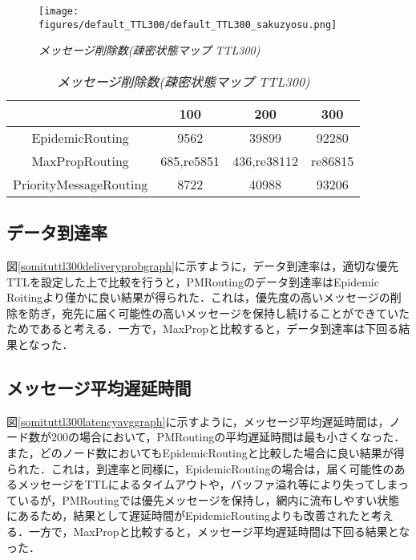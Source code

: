 \documentclass[11pt]{icsthesis}
\begin{document}
\begin{figure}[h]
\centering
\texttt{[image: figures/default\_TTL300/default\_TTL300\_sakuzyosu.png]}
\caption[]{\it{メッセージ削除数(疎密状態マップ TTL300)}}
\label{somituttl300droppedgraph}
\end{figure}

\begin{table}[H]
 \begin{center}
      \caption[]{\it{メッセージ削除数(疎密状態マップ TTL300)}}
      \label{somituTtl300dropped}
      \begin{tabular}{|c|c|c|c|}
\hline
&100&200&300\\
\hline
EpidemicRouting&9562&39899&92280\\
\hline
MaxPropRouting&685,re5851&436,re38112&re86815\\
\hline
PriorityMessageRouting&8722&40988&93206\\
\hline
      \end{tabular}
    \end{center}
\end{table}

\subsection{データ到達率}
図\ref{somituttl300deliveryprobgraph}に示すように，データ到達率は，適切な優先TTLを設定した上で比較を行うと，PMRoutingのデータ到達率はEpidemic Roitingより僅かに良い結果が得られた．これは，優先度の高いメッセージの削除を防ぎ，宛先に届く可能性の高いメッセージを保持し続けることができていたためであると考える．一方で，MaxPropと比較すると，データ到達率は下回る結果となった．\\
\subsection{メッセージ平均遅延時間}
図\ref{somituttl300latencyavggraph}に示すように，メッセージ平均遅延時間は，ノード数が200の場合において，PMRoutingの平均遅延時間は最も小さくなった．また，どのノード数においてもEpidemicRoutingと比較した場合に良い結果が得られた．これは，到達率と同様に，EpidemicRoutingの場合は，届く可能性のあるメッセージをTTLによるタイムアウトや，バッファ溢れ等により失ってしまっているが，PMRoutingでは優先メッセージを保持し，網内に流布しやすい状態にあるため，結果として遅延時間がEpidemicRoutingよりも改善されたと考える．一方で，MaxPropと比較すると，メッセージ平均遅延時間は下回る結果となった．\\
\end{document}
